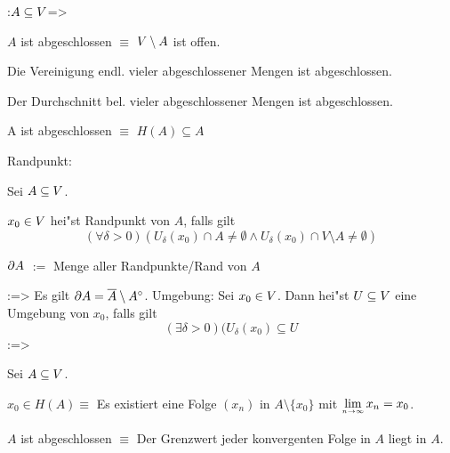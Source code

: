 \theorem:$A\subseteq V$=>{
  \begin{stmts}
    \item $A$ ist abgeschlossen $\equiv$ $V\setminus A$ ist offen. \\
    \item Die Vereinigung endl. vieler abgeschlossener Mengen ist abgeschlossen. \\
    \item Der Durchschnitt bel. vieler abgeschlossener Mengen ist abgeschlossen. \\
    \item A ist abgeschlossen $\equiv$ $H(A)\subseteq A$
    \end{stmts}
  }
 Randpunkt:{
  Sei $A\subseteq V$.
  \begin{stmts}
    \item 
      $x_0\in V$ hei"st Randpunkt von $A$, falls gilt
      \[(\forall \delta>0)(U_\delta(x_0)\cap A\neq\emptyset \land 
        U_\delta(x_0)\cap V\setminus A\neq\emptyset)\]
    \item
      $\partial{A}$ $:=$ Menge aller Randpunkte/Rand von $A$
    \end{stmts}
  }
\lessertheorem:=>{
  Es gilt $\partial{A}=\overline{A}\setminus{A}^\circ$.
  }
 Umgebung:{
  Sei $x_0\in V$. Dann hei"st $U\subseteq V$ eine Umgebung von $x_0$, falls gilt
  \[(\exists \delta>0)(U_\delta(x_0)\subseteq U
    \]
  }
\theorem:=>{
  Sei $A\subseteq V$.
  \begin{stmts}
    \item 
      $x_0\in H(A)$$\equiv$ Es existiert eine Folge $(x_n)$ in 
      $A\setminus\{x_0\}$ mit $\limn x_n = x_0$.
    \item
      $A$ ist abgeschlossen $\equiv$ Der Grenzwert jeder konvergenten Folge in $A$
      liegt in $A$.
    \end{stmts}
  }
